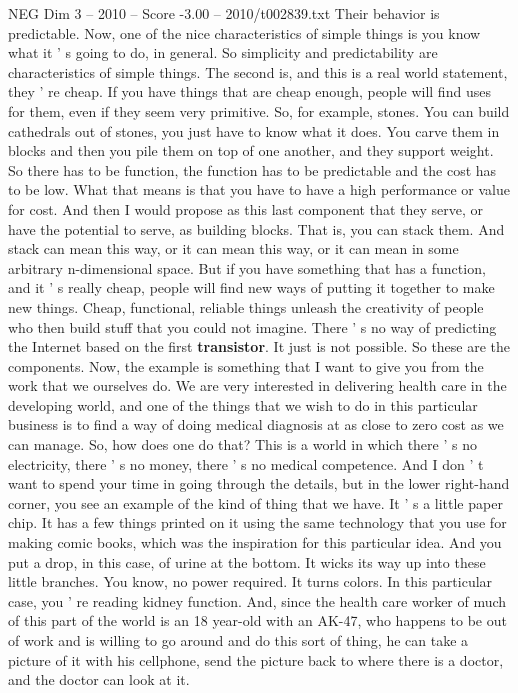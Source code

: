 \begin{textsample}{NEG Dim 3 – 2010 – Score -3.00 – 2010/t002839.txt}
Their behavior is predictable.
Now, one of the nice characteristics of simple things is you know what it ' s going to do, in general.
So simplicity and predictability are characteristics of simple things.
The second is, and this is a real world statement, they ' re cheap.
If you have things that are cheap enough, people will find uses for them, even if they seem very primitive.
So, for example, stones.
You can build cathedrals out of stones, you just have to know what it does.
You carve them in blocks and then you pile them on top of one another, and they support weight.
So there has to be function, the function has to be predictable and the cost has to be low.
What that means is that you have to have a high performance or value for cost.
And then I would propose as this last component that they serve, or have the potential to serve, as building blocks.
That is, you can stack them.
And stack can mean this way, or it can mean this way, or it can mean in some arbitrary n-dimensional space.
But if you have something that has a function, and it ' s really cheap, people will find new ways of putting it together to make new things.
Cheap, functional, reliable things unleash the creativity of people who then build stuff that you could not imagine.
There ' s no way of predicting the Internet based on the first \textbf{transistor}.
It just is not possible.
So these are the components.
Now, the example is something that I want to give you from the work that we ourselves do.
We are very interested in delivering health care in the developing world, and one of the things that we wish to do in this particular business is to find a way of doing medical diagnosis at as close to zero cost as we can manage.
So, how does one do that?
This is a world in which there ' s no electricity, there ' s no money, there ' s no medical competence.
And I don ' t want to spend your time in going through the details, but in the lower right-hand corner, you see an example of the kind of thing that we have.
It ' s a little paper chip.
It has a few things printed on it using the same technology that you use for making comic books, which was the inspiration for this particular idea.
And you put a drop, in this case, of urine at the bottom.
It wicks its way up into these little branches.
You know, no power required.
It turns colors.
In this particular case, you ' re reading kidney function.
And, since the health care worker of much of this part of the world is an 18 year-old with an AK-47, who happens to be out of work and is willing to go around and do this sort of thing, he can take a picture of it with his cellphone, send the picture back to where there is a doctor, and the doctor can look at it.

\end{textsample}
